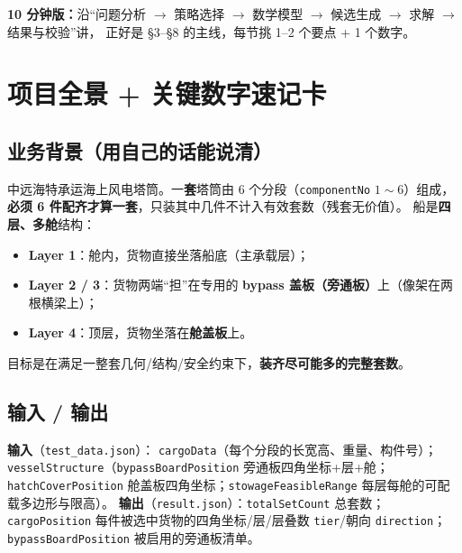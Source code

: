 \documentclass[11pt]{ctexart}
\newcommand{\code}[1]{\texttt{#1}}
\begin{document}
\textbf{10 分钟版：}沿“问题分析 $\to$ 策略选择 $\to$ 数学模型 $\to$ 候选生成 $\to$ 求解 $\to$ 结果与校验”讲，
正好是 \S3--\S8 的主线，每节挑 1--2 个要点 + 1 个数字。

\section{项目全景 + 关键数字速记卡}

\subsection{业务背景（用自己的话能说清）}
中远海特承运海上风电塔筒。一\textbf{套}塔筒由 6 个分段（\code{componentNo} $1\sim6$）组成，
\textbf{必须 6 件配齐才算一套}，只装其中几件不计入有效套数（残套无价值）。
船是\textbf{四层、多舱}结构：
\begin{itemize}[leftmargin=1.8em,itemsep=1pt]
  \item \textbf{Layer 1}：舱内，货物直接坐落船底（主承载层）；
  \item \textbf{Layer 2 / 3}：货物两端“担”在专用的 \textbf{bypass 盖板（旁通板）}上（像架在两根横梁上）；
  \item \textbf{Layer 4}：顶层，货物坐落在\textbf{舱盖板}上。
\end{itemize}
目标是在满足一整套几何/结构/安全约束下，\textbf{装齐尽可能多的完整套数}。

\subsection{输入 / 输出}
\textbf{输入}（\code{test\_data.json}）：
\code{cargoData}（每个分段的长宽高、重量、构件号）；
\code{vesselStructure}（\code{bypassBoardPosition} 旁通板四角坐标+层+舱；
\code{hatchCoverPosition} 舱盖板四角坐标；\code{stowageFeasibleRange} 每层每舱的可配载多边形与限高）。
\textbf{输出}（\code{result.json}）：\code{totalSetCount} 总套数；\code{cargoPosition} 每件被选中货物的四角坐标/层/层叠数 \code{tier}/朝向 \code{direction}；
\code{bypassBoardPosition} 被启用的旁通板清单。
\end{document}
